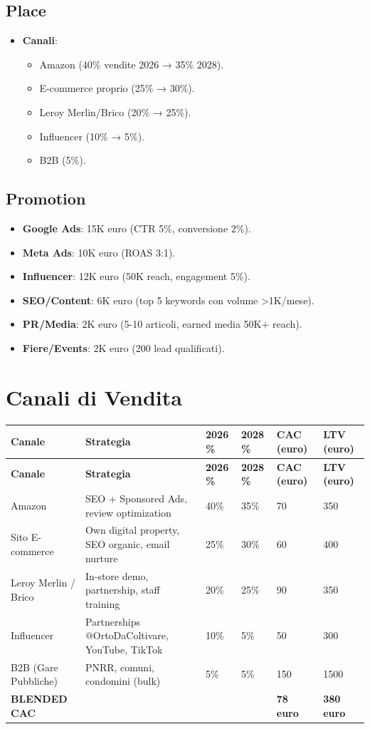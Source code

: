 \documentclass[11pt,a4paper]{report}
\begin{document}
\subsection{Place}
\begin{itemize}
\item {\bf Canali}:
  \begin{itemize}
  \item Amazon (40\% vendite 2026 → 35\% 2028).
  \item E-commerce proprio (25\% → 30\%).
  \item Leroy Merlin/Brico (20\% → 25\%).
  \item Influencer (10\% → 5\%).
  \item B2B (5\%).
  \end{itemize}
\end{itemize}

\subsection{Promotion}
\begin{itemize}
\item {\bf Google Ads}: 15K euro (CTR 5\%, conversione 2\%).
\item {\bf Meta Ads}: 10K euro (ROAS 3:1).
\item {\bf Influencer}: 12K euro (50K reach, engagement 5\%).
\item {\bf SEO/Content}: 6K euro (top 5 keywords con volume >1K/mese).
\item {\bf PR/Media}: 2K euro (5-10 articoli, earned media 50K+ reach).
\item {\bf Fiere/Events}: 2K euro (200 lead qualificati).
\end{itemize}

\section{Canali di Vendita}
\begin{longtable}{|L{2.5cm}|L{3cm}|C{1.2cm}|C{1.2cm}|C{1.5cm}|L{1.5cm}|}
\hline
{\bf Canale} & {\bf Strategia} & {\bf 2026 \%} & {\bf 2028 \%} & {\bf CAC (euro)} & {\bf LTV (euro)} \\ \hline
\endfirsthead
\hline
{\bf Canale} & {\bf Strategia} & {\bf 2026 \%} & {\bf 2028 \%} & {\bf CAC (euro)} & {\bf LTV (euro)} \\ \hline
\endhead
\endfoot
\endlastfoot
Amazon & SEO + Sponsored Ads, review optimization & 40\% & 35\% & 70 & 350 \\
Sito E-commerce & Own digital property, SEO organic, email nurture & 25\% & 30\% & 60 & 400 \\
Leroy Merlin / Brico & In-store demo, partnership, staff training & 20\% & 25\% & 90 & 350 \\
Influencer & Partnerships @OrtoDaColtivare, YouTube, TikTok & 10\% & 5\% & 50 & 300 \\
B2B (Gare Pubbliche) & PNRR, comuni, condomini (bulk) & 5\% & 5\% & 150 & 1500 \\ \hline
{\bf BLENDED CAC} & & & & {\bf 78 euro} & {\bf 380 euro} \\ \hline
\end{longtable}
\end{document}
